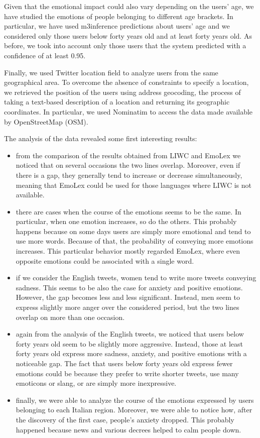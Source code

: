 Given that the emotional impact could also vary depending on the users' age, we have studied the emotions of people belonging to different age brackets. In particular, we have used m3inference predictions about users' age and we considered only those users below forty years old and at least forty years old. As before, we took into account only those users that the system predicted with a confidence of at least 0.95. 

Finally, we used Twitter location field to analyze users from the same geographical area. To overcome the absence of constraints to specify a location, we retrieved the position of the users using address geocoding, the process of taking a text-based description of a location and returning its geographic coordinates. In particular, we used Nominatim to access the data made available by OpenStreetMap (OSM).

The analysis of the data revealed some first interesting results:

\begin{itemize}
	\item from the comparison of the results obtained from LIWC and EmoLex we noticed that on several occasions the two lines overlap. Moreover, even if there is a gap, they generally tend to increase or decrease simultaneously, meaning that EmoLex could be used for those languages where LIWC is not available.
	\item there are cases when the course of the emotions seems to be the same. In particular, when one emotion increases, so do the others. This probably happens because on some days users are simply more emotional and tend to use more words. Because of that, the probability of conveying more emotions increases. This particular behavior mostly regarded EmoLex, where even opposite emotions could be associated with a single word.
	\item if we consider the English tweets, women tend to write more tweets conveying sadness. This seems to be also the case for anxiety and positive emotions. However, the gap becomes less and less significant. Instead, men seem to express slightly more anger over the considered period, but the two lines overlap on more than one occasion.
	\item again from the analysis of the English tweets, we noticed that users below forty years old seem to be slightly more aggressive. Instead, those at least forty years old express more sadness, anxiety, and positive emotions with a noticeable gap. The fact that users below forty years old express fewer emotions could be because they prefer to write shorter tweets, use many emoticons or slang, or are simply more inexpressive.
	\item finally, we were able to analyze the course of the emotions expressed by users belonging to each Italian region. Moreover, we were able to notice how, after the discovery of the first case, people's anxiety dropped. This probably happened because news and various decrees helped to calm people down.
\end{itemize}

